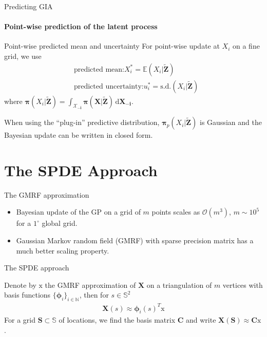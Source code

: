 \documentclass{beamer}
\newcommand{\ud}{\,\mathrm{d}}
\begin{document}
\begin{frame}{Predicting GIA}
\framesubtitle{Point-wise prediction of the latent process}
\begin{block}{Point-wise predicted mean and uncertainty}
For point-wise update at $X_i$ on a fine grid, we use 
\begin{align*}
&\mbox{predicted mean:} X_i^* = \mathbb{E}(X_i| \bm{\tilde{Z}}) \\
&\mbox{predicted uncertainty:} u_i^* = \mbox{s.d.}(X_i| \bm{\tilde{Z}})
\end{align*}
where $\bm{\pi}(X_i | \bm{\tilde{Z}}) = \int_{\bm{\mathcal{X}_{-i}}} \bm{\pi}(\bm{X} | \bm{\tilde{Z}}) \ud \bm{X_{-i}}$.

\end{block}
When using the ``plug-in'' predictive distribution, $\bm{\pi}_{p}(X_i | \bm{\tilde{Z}})$ is Gaussian and the Bayesian update can be written in closed form.
\end{frame}




\section{The SPDE Approach}
\begin{frame}{The GMRF approximation}
\begin{itemize}
\item Bayesian update of the GP on a grid of $m$ points scales as $\mathcal{O}(m^3)$, $m \sim 10^5$ for a $1^\circ $ global grid.
\item Gaussian Markov random field (GMRF) with sparse precision matrix has a much better scaling property.
\end{itemize}

\begin{block}{The SPDE approach \citep{Lindgren2011}} 

Denote by $\bm{\mathrm{x}}$ the GMRF approximation of $\bm{X}$ on a triangulation of $m$ vertices with basis functions $\{ \bm{\phi}_i \}_{i \in \mathbb{N}}$, then for $s \in \mathbb{S}^2$
\begin{align}
\bm{X}(s) \approx \bm{\phi}_i(s)^T\bm{\mathrm{x}}
\end{align}
For a grid $\bm{S} \subset \mathbb{S}$ of locations, we find the basis matrix $\bm{C}$ and write $\bm{X}(\bm{S}) \approx \bm{C}\bm{\mathrm{x}}$.
\end{block}
\end{frame}
\end{document}
